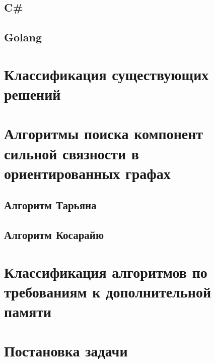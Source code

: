 \subsection{C\#}

\subsection{Golang}



\section{Классификация существующих решений}



\section{Алгоритмы поиска компонент сильной связности в ориентированных графах}

\subsection{Алгоритм Тарьяна}

\subsection{Алгоритм Косарайю}



\section{Классификация алгоритмов по требованиям к дополнительной памяти}



\section{Постановка задачи}



